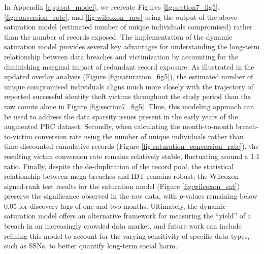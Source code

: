 In Appendix \ref{app:sat_model}, we recreate Figures \ref{fig:section7_fig5}, \ref{fig:conversion_rate}, and \ref{fig:wilcoxon_raw} using the output of the above saturation model (estimated number of unique individuals compromised) rather than the number of records exposed. The implementation of the dynamic saturation model provides several key advantages for understanding the long-term relationship between data breaches and victimization by accounting for the diminishing marginal impact of redundant record exposure. As illustrated in the updated overlay analysis (Figure \ref{fig:saturation_fig5}), the estimated number of unique compromised individuals aligns much more closely with the trajectory of reported successful identity theft victims throughout the study period than the raw counts alone in Figure \ref{fig:section7_fig5}. Thus, this modeling approach can be used to address the data sparsity issues present in the early years of the augmented PRC dataset. 
%
Secondly, when calculating the month-to-month breach-to-victim conversion rate using the number of unique individuals rather than time-discounted cumulative records (Figure \ref{fig:saturation_conversion_rate}), the resulting victim conversion rate remains relatively stable, fluctuating around a 1:1 ratio. 
%
Finally, despite the de-duplication of the record pool, the statistical relationship between mega-breaches and IDT remains robust; the Wilcoxon signed-rank test results for the saturation model (Figure \ref{fig:wilcoxon_sat}) preserve the significance observed in the raw data, with $p$-values remaining below 0.05 for discovery lags of one and two months. Ultimately, the dynamic saturation model offers an alternative framework for measuring the ``yield'' of a breach in an increasingly crowded data market, and future work can include refining this model to account for the varying sensitivity of specific data types, such as SSNs, to better quantify long-term social harm.

